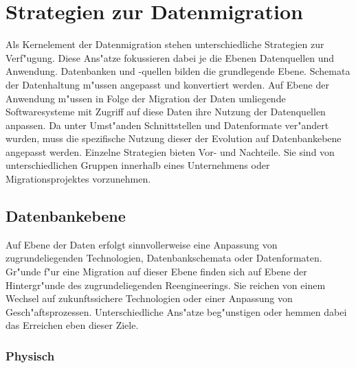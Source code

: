 \section{Strategien zur Datenmigration}
\label{chapter:strategien}

Als Kernelement der Datenmigration stehen unterschiedliche Strategien zur Verf"ugung. Diese Ans"atze fokussieren dabei je die Ebenen Datenquellen und Anwendung\citep{henrard-2002}. Datenbanken und -quellen bilden die grundlegende Ebene. Schemata der Datenhaltung m"ussen angepasst und konvertiert werden. 
\lb
Auf Ebene der Anwendung m"ussen in Folge der Migration der Daten umliegende Softwaresysteme mit Zugriff auf diese Daten ihre Nutzung der Datenquellen anpassen. Da unter Umst"anden Schnittstellen und Datenformate ver"andert wurden, muss die spezifische Nutzung dieser der Evolution auf Datenbankebene angepasst werden.
\lb
Einzelne Strategien bieten Vor- und Nachteile. Sie sind von unterschiedlichen Gruppen innerhalb eines Unternehmens oder Migrationsprojektes vorzunehmen.


\subsection{Datenbankebene}

Auf Ebene der Daten erfolgt sinnvollerweise eine Anpassung von zugrundeliegenden Technologien, Datenbankschemata oder Datenformaten. Gr"unde f"ur eine Migration auf dieser Ebene finden sich auf Ebene der Hintergr"unde des zugrundeliegenden Reengineerings. Sie reichen von einem Wechsel auf zukunftssichere Technologien oder einer Anpassung von Gesch"aftsprozessen. Unterschiedliche Ans"atze beg"unstigen oder hemmen dabei das Erreichen eben dieser Ziele. 

\subsubsection{Physisch}

